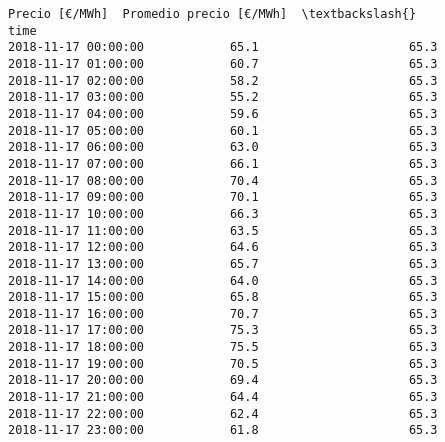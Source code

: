 \documentclass[11pt]{article}
\makeatletter
\newcommand{\boxspacing}{\kern\kvtcb@left@rule\kern\kvtcb@boxsep}
\newcommand{\prompt}[4]{
        {\ttfamily\llap{{\color{#2}[#3]:\hspace{3pt}#4}}\vspace{-\baselineskip}}
    }
\makeatother
\begin{document}
            \begin{tcolorbox}[breakable, size=fbox, boxrule=.5pt, pad at break*=1mm, opacityfill=0]
\prompt{Out}{outcolor}{96}{\boxspacing}
\begin{Verbatim}[commandchars=\\\{\}]
                     Precio [€/MWh]  Promedio precio [€/MWh]  \textbackslash{}
time
2018-11-17 00:00:00            65.1                     65.3
2018-11-17 01:00:00            60.7                     65.3
2018-11-17 02:00:00            58.2                     65.3
2018-11-17 03:00:00            55.2                     65.3
2018-11-17 04:00:00            59.6                     65.3
2018-11-17 05:00:00            60.1                     65.3
2018-11-17 06:00:00            63.0                     65.3
2018-11-17 07:00:00            66.1                     65.3
2018-11-17 08:00:00            70.4                     65.3
2018-11-17 09:00:00            70.1                     65.3
2018-11-17 10:00:00            66.3                     65.3
2018-11-17 11:00:00            63.5                     65.3
2018-11-17 12:00:00            64.6                     65.3
2018-11-17 13:00:00            65.7                     65.3
2018-11-17 14:00:00            64.0                     65.3
2018-11-17 15:00:00            65.8                     65.3
2018-11-17 16:00:00            70.7                     65.3
2018-11-17 17:00:00            75.3                     65.3
2018-11-17 18:00:00            75.5                     65.3
2018-11-17 19:00:00            70.5                     65.3
2018-11-17 20:00:00            69.4                     65.3
2018-11-17 21:00:00            64.4                     65.3
2018-11-17 22:00:00            62.4                     65.3
2018-11-17 23:00:00            61.8                     65.3


\end{Verbatim}
\end{tcolorbox}
\end{document}
